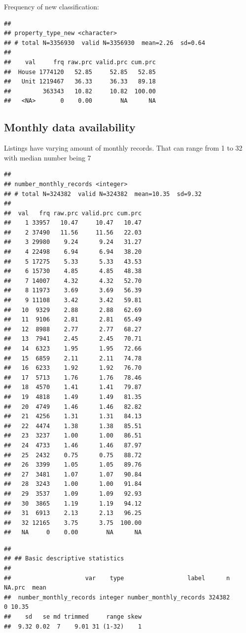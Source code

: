 \documentclass[]{article}
\begin{document}
Frequency of new classification:

\begin{verbatim}
## 
## property_type_new <character>
## # total N=3356930  valid N=3356930  mean=2.26  sd=0.64
## 
##    val     frq raw.prc valid.prc cum.prc
##  House 1774120   52.85     52.85   52.85
##   Unit 1219467   36.33     36.33   89.18
##         363343   10.82     10.82  100.00
##   <NA>       0    0.00        NA      NA
\end{verbatim}

\subsection{Monthly data availability}\label{monthly-data-availability}

Listings have varying amount of monthly records. That can range from 1
to 32 with median number being 7

\begin{verbatim}
## 
## number_monthly_records <integer>
## # total N=324382  valid N=324382  mean=10.35  sd=9.32
## 
##  val   frq raw.prc valid.prc cum.prc
##    1 33957   10.47     10.47   10.47
##    2 37490   11.56     11.56   22.03
##    3 29980    9.24      9.24   31.27
##    4 22498    6.94      6.94   38.20
##    5 17275    5.33      5.33   43.53
##    6 15730    4.85      4.85   48.38
##    7 14007    4.32      4.32   52.70
##    8 11973    3.69      3.69   56.39
##    9 11108    3.42      3.42   59.81
##   10  9329    2.88      2.88   62.69
##   11  9106    2.81      2.81   65.49
##   12  8988    2.77      2.77   68.27
##   13  7941    2.45      2.45   70.71
##   14  6323    1.95      1.95   72.66
##   15  6859    2.11      2.11   74.78
##   16  6233    1.92      1.92   76.70
##   17  5713    1.76      1.76   78.46
##   18  4570    1.41      1.41   79.87
##   19  4818    1.49      1.49   81.35
##   20  4749    1.46      1.46   82.82
##   21  4256    1.31      1.31   84.13
##   22  4474    1.38      1.38   85.51
##   23  3237    1.00      1.00   86.51
##   24  4733    1.46      1.46   87.97
##   25  2432    0.75      0.75   88.72
##   26  3399    1.05      1.05   89.76
##   27  3481    1.07      1.07   90.84
##   28  3243    1.00      1.00   91.84
##   29  3537    1.09      1.09   92.93
##   30  3865    1.19      1.19   94.12
##   31  6913    2.13      2.13   96.25
##   32 12165    3.75      3.75  100.00
##   NA     0    0.00        NA      NA
\end{verbatim}

\begin{verbatim}
## 
## ## Basic descriptive statistics
## 
##                     var    type                  label      n NA.prc  mean
##  number_monthly_records integer number_monthly_records 324382      0 10.35
##    sd   se md trimmed     range skew
##  9.32 0.02  7    9.01 31 (1-32)    1
\end{verbatim}
\end{document}
